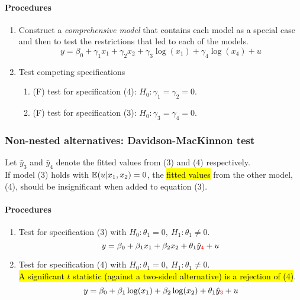 \documentclass[]{article}
\begin{document}
			\paragraph{Procedures}
			\begin{enumerate}
				\item Construct a \emph{comprehensive model} that contains each model as a special case and then to test the restrictions that led to each of the models.
				\begin{equation}
					y = \beta_0 + \gamma_1 x_1 + \gamma_2 x_2 + \gamma_3 \log(x_1) + \gamma_4 \log(x_4) + u
				\end{equation}
				\item Test competing specifications
				\begin{enumerate}
					\item (F) test for specification (4): $H_0: \gamma_1 = \gamma_2 = 0$.
					\item (F) test for specification (3): $H_0: \gamma_3 = \gamma_4 = 0$.
				\end{enumerate}
			\end{enumerate}
			
			
		\subsubsection{Non-nested alternatives: Davidson-MacKinnon test}
			\par Let $\hat{y}_3$ and $\hat{y}_4$ denote the fitted values from (3) and (4) respectively. \\
			If model (3) holds with $\mathbb{E}({u|x_1, x_2})=0$, the \hl{fitted values} from the other model, (4), should be insignificant when added to equation (3).
			
			\paragraph{Procedures}
			\begin{enumerate}
				\item Test for specification (3) with $H_0: \theta_1=0,\ H_1: \theta_1 \neq 0$.
					\begin{equation}
						y = \beta_0 + \beta_1 x_1 + \beta_2 x_2 + \theta_1 \hat{y}_{\textcolor{red}{4}} + u
					\end{equation}
				\item Test for specification (4) with $H_0: \theta_1=0,\ H_1: \theta_1 \neq 0$. \\ \hl{A significant $t$ statistic (against a two-sided alternative) is a rejection of (4)}.
					\begin{equation}
						y = \beta_0 + \beta_1 \log(x_1) + \beta_2 \log(x_2) + \theta_1 \hat{y}_{\textcolor{red}{3}} + u
					\end{equation}
			\end{enumerate}
			
\end{document}
